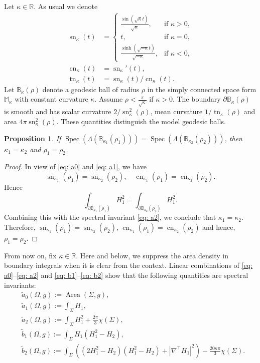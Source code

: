 \documentclass[11pt]{amsart}
\newcommand{\Area}{\operatorname{Area}}
\newcommand{\sn}{\operatorname{sn}}
\newcommand{\cn}{\operatorname{cn}}
\newcommand{\tn}{\operatorname{tn}}
\newcommand{\Spec}{\operatorname{Spec}}
\newtheorem{proposition}[theorem]{Proposition}
\theoremstyle{definition}
\numberwithin{equation}{section}
\begin{document}
Let $\kappa \in \mathbb R$. As usual we denote 
\begin{align*}
    \sn_\kappa(t) & =\begin{cases}
        \frac{\sin(\sqrt{\kappa}t)}{\sqrt{\kappa}}, &   \text{if } \kappa > 0,\\
        t, &   \text{if }  \kappa = 0,\\
        \frac{\sinh(\sqrt{-\kappa}t)}{\sqrt{-\kappa}}, &  \text{if }  \kappa < 0,
    \end{cases} \\ 
    \cn_\kappa(t) & = \sn_\kappa'(t),\\
    \tn_\kappa(t) & = \sn_\kappa(t)/\cn_\kappa(t).
\end{align*}
Let $\mathbb B_\kappa(\rho)$ denote a geodesic ball of radius $\rho$ in the simply connected space form $\mathbb M_\kappa$ with constant curvature $\kappa$. Assume $\rho < \frac{\pi}{\sqrt{\kappa}}$ if $\kappa > 0$. The boundary $\partial\mathbb B_\kappa(\rho)$ is smooth and has scalar curvature $2/\sn_\kappa^2(\rho)$, mean curvature $1/\tn_\kappa(\rho)$ and area $4\pi \sn_{\kappa}^2(\rho)$. These quantities distinguish the model geodesic balls.
\begin{proposition}
    If $\Spec(\Lambda(\mathbb B_{\kappa_1}(\rho_1))) = \Spec(\Lambda(\mathbb B_{\kappa_2}(\rho_2)))$, then $\kappa_1 = \kappa_2$ and $\rho_1 = \rho_2$.
\end{proposition}
\begin{proof}
In view of \eqref{eq: a0} and \eqref{eq: a1}, we have
\[\sn_{\kappa_1}(\rho_1) = \sn_{\kappa_2}(\rho_2),\quad \cn_{\kappa_1}(\rho_1) = \cn_{\kappa_2}(\rho_2).\]
Hence 
\[\int_{\partial\mathbb B_{\kappa_1}(\rho_1)} H_1^2 =  \int_{\partial\mathbb B_{\kappa_2}(\rho_2)} H_1^2.\]
Combining this with the spectral invariant \eqref{eq: a2}, we conclude that $\kappa_1 = \kappa_2$. Therefore, $\sn_{\kappa_1}(\rho_1) = \sn_{\kappa_2}(\rho_2)$,  $\cn_{\kappa_1}(\rho_1) = \cn_{\kappa_2}(\rho_2)$ and hence, $\rho_1 = \rho_2$.
\end{proof}

From now on, fix $\kappa\in\mathbb R$. Here and below, we suppress the area density in boundary integrals when it is clear from the context. Linear combinations of \eqref{eq: a0}--\eqref{eq: a2} and \eqref{eq: b1}--\eqref{eq: b2} show that the following quantities are spectral invariants: 
\begin{align*}
    & \tilde a_0(\Omega,g) := \Area(\Sigma,g),\\
    & \tilde a_1(\Omega,g) := \int_\Sigma H_1,\\
    & \tilde a_2(\Omega,g) := \int_\Sigma H_1^2 + \frac{2\pi}{3}\chi(\Sigma),\\
    & \tilde b_1(\Omega,g) := \int_\Sigma H_1(H_1^2-H_2),\\
    & \tilde b_2(\Omega,g) := \int_\Sigma\left((2H_1^2-H_2)(H_1^2-H_2) + |\nabla^\top H_1|^2\right) - \frac{20\kappa\pi}{3}\chi(\Sigma).
\end{align*}
\end{document}
